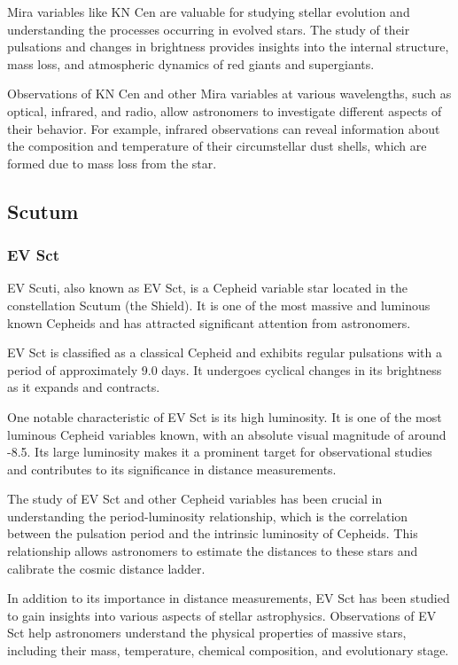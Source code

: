 Mira variables like KN Cen are valuable for studying stellar evolution and understanding the processes occurring in evolved stars. The study of their pulsations and changes in brightness provides insights into the internal structure, mass loss, and atmospheric dynamics of red giants and supergiants.

Observations of KN Cen and other Mira variables at various wavelengths, such as optical, infrared, and radio, allow astronomers to investigate different aspects of their behavior. For example, infrared observations can reveal information about the composition and temperature of their circumstellar dust shells, which are formed due to mass loss from the star.

\subsection{Scutum}
\subsubsection*{ EV Sct }
EV Scuti, also known as EV Sct, is a Cepheid variable star located in the constellation Scutum (the Shield). It is one of the most massive and luminous known Cepheids and has attracted significant attention from astronomers.

EV Sct is classified as a classical Cepheid and exhibits regular pulsations with a period of approximately 9.0 days. It undergoes cyclical changes in its brightness as it expands and contracts.

One notable characteristic of EV Sct is its high luminosity. It is one of the most luminous Cepheid variables known, with an absolute visual magnitude of around -8.5. Its large luminosity makes it a prominent target for observational studies and contributes to its significance in distance measurements.

The study of EV Sct and other Cepheid variables has been crucial in understanding the period-luminosity relationship, which is the correlation between the pulsation period and the intrinsic luminosity of Cepheids. This relationship allows astronomers to estimate the distances to these stars and calibrate the cosmic distance ladder.

In addition to its importance in distance measurements, EV Sct has been studied to gain insights into various aspects of stellar astrophysics. Observations of EV Sct help astronomers understand the physical properties of massive stars, including their mass, temperature, chemical composition, and evolutionary stage.

